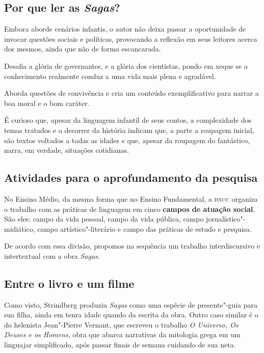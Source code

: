\documentclass[12pt]{extarticle}
\begin{document}
\subsection{Por que ler as \emph{Sagas}?}

Embora aborde cenários infantis, o autor não deixa passar a oportunidade
de invocar questões sociais e políticas, provocando a reflexão em seus
leitores acerca dos mesmos, ainda que não de forma escancarada.

Desafia a glória de governantes, e a glória dos cientistas, pondo em
xeque se o conhecimento realmente conduz a uma vida mais plena e
agradável.

Aborda questões de convivência e cria um conteúdo exemplificativo para
narrar a boa moral e o bom caráter.

É curioso que, apesar da linguagem infantil de seus contos, a
complexidade dos temas tratados e o decorrer da história indicam que, a
parte a roupagem inicial, são textos voltados a todas as idades e que,
apesar da roupagem do fantástico, narra, em verdade, situações
cotidianas.

\subsection{Atividades para o aprofundamento da pesquisa}

No Ensino Médio, da mesma forma que no Ensino Fundamental, a \textsc{bncc}
organiza o trabalho com as práticas de linguagem em cinco \textbf{campos
de atuação social}. São eles: campo da vida pessoal, campo da vida
pública, campo jornalístico"-midiático, campo artístico"-literário e campo
das práticas de estudo e pesquisa.

De acordo com essa divisão, propomos na sequência um trabalho
interdiscursivo e intertextual com a obra \emph{Sagas.}



\subsection{Entre o livro e um filme}


Como visto, Strindberg produziu \emph{Sagas} como uma espécie de
presente"-guia para sua filha, ainda em tenra idade quando da escrita
da obra. Outro caso similar é o do helenista Jean"-Pierre Vernant, que
escreveu o trabalho \emph{O Universo, Os Deuses e os Homens}, obra que
abarca narrativas da mitologia grega em um linguajar simplificado,
após passar finais de semana cuidando de sua neta.
\end{document}
